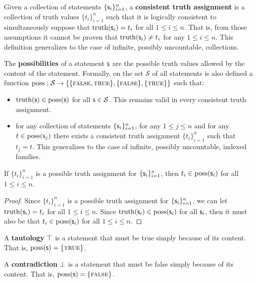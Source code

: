 \documentclass[11pt,letterpaper,fleqn]{memoir} %
\begin{document}
\begin{mathSection}
	\begin{defn}
	Given a collection of statements $\{\mathsf{s}_i\}^n_{i=1}$, a \textbf{consistent truth assignment} is a collection of truth values $\{t_i\}^n_{i=1}$ such that it is logically consistent to simultaneously suppose that $\operatorname{truth}(\mathsf{s}_i) = t_i$ for all $1 \leq i \leq n$. That is, from those assumptions it cannot be proven that $\operatorname{truth}(\mathsf{s}_i) \neq t_i$ for any $1 \leq i \leq n$.  This definition generalizes to the case of infinite, possibly uncountable, collections.
\end{defn}
	
\begin{axiom}\label{ax_possibilities}
	The \textbf{possibilities} of a statement $\mathsf{s}$ are the possible truth values allowed by the content of the statement. Formally, on the set $\mathcal{S}$ of all statements is also defined a function $\operatorname{poss}: \mathcal{S} \to \{\{\textsc{false}, \textsc{true}\},\{\textsc{false}\},\{\textsc{true}\}\}$ such that:
	\begin{itemize}
		\item $\operatorname{truth}(\mathsf{s}) \in \operatorname{poss}(\mathsf{s})$ for all $\mathsf{s} \in \mathcal{S}$. This remains valid in every consistent truth assignment.
		\item for any collection of statements $\{\mathsf{s}_i\}^n_{i=1}$, for any $1 \leq j \leq n$ and for any $t \in \operatorname{poss}(\mathsf{s}_j)$ there exists a consistent truth assignment $\{t_i\}^n_{i=1}$ such that $t_j = t$. This generalizes to the case of infinite, possibly uncountable, indexed families.
	\end{itemize}
\end{axiom}

\begin{coro}
	If $\{t_i\}^n_{i=1}$ is a possible truth assignment for $\{\mathsf{s}_i\}^n_{i=1}$, then $t_i \in \operatorname{poss}(\mathsf{s}_i)$ for all $1 \leq i \leq n$.
\end{coro}
\begin{proof}
	Since $\{t_i\}^n_{i=1}$ is a possible truth assignment for $\{\mathsf{s}_i\}^n_{i=1}$, we can let $\operatorname{truth}(\mathsf{s}_i) = t_i$ for all $1 \leq i \leq n$. Since $\operatorname{truth}(\mathsf{s}_i) \in \operatorname{poss}(\mathsf{s}_i)$ for all $\mathsf{s}_i$, then it must also be that $t_i \in \operatorname{poss}(\mathsf{s}_i)$ for all $1 \leq i \leq n$.
\end{proof}

	\begin{defn}
		A \textbf{tautology} $\top$ is a statement that must be true simply because of its content. That is, $\operatorname{poss}(\mathsf{s}) = \{\textsc{true}\}$.
	\end{defn}
	
	\begin{defn}
		A \textbf{contradiction} $\bot$ is a statement that must be false simply because of its content. That is, $\operatorname{poss}(\mathsf{s}) = \{\textsc{false}\}$.
	\end{defn}
	
\end{mathSection}
\end{document}
